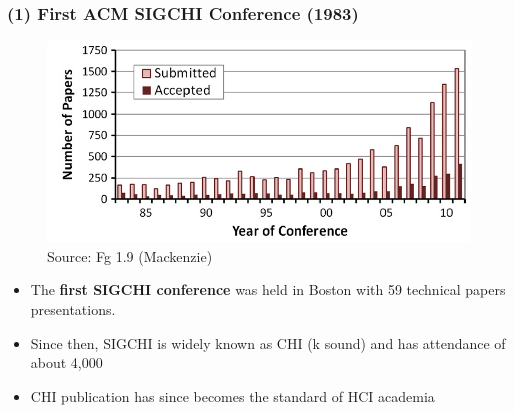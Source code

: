 \documentclass{beamer}
\begin{document}

\begin{frame}
\frametitle{(1) First ACM SIGCHI Conference (1983)}
\begin{figure}
	\includegraphics[width=0.5\linewidth]{submissions}
	\caption{Source: Fg 1.9 (Mackenzie)}
\end{figure}
\footnotesize
\begin{itemize}
	\item The \textbf{first SIGCHI conference} was held in Boston with 59 technical papers presentations.  
	\item Since then, SIGCHI is widely known as CHI (k sound) and has attendance of about 4,000
	\item CHI publication has since becomes the standard of HCI academia
\end{itemize}
\end{frame}
\end{document}
